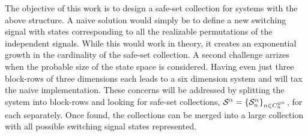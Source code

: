 The objective of this work is to design a safe-set collection for systems with the above structure. A naive solution would simply be to define a new switching signal with states corresponding to all the realizable permutations of the independent signals. While this would work in theory, it creates an exponential growth in the cardinality of the safe-set collection. A second challenge arrizes when the probable size of the state space is considered. Having even just three block-rows of three dimensions each leads to a six dimension system and will tax the naive implementation. These concerns will be addressed by splitting the system into block-rows and looking for safe-set collections, $\mathcal{S}^{\agentidx}=\{\mathcal{S}^\agentidx_n\}_{n\in\gnumnodes[\agentidx]}$, for each separately. Once found, the collections can be merged into a large collection with all possible switching signal states represented.

